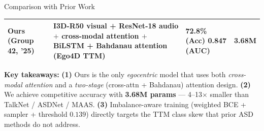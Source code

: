 \documentclass[aspectratio=169, 10pt]{beamer}
\begin{document}
\begin{frame}{Comparison with Prior Work}
\begin{center}
\begin{tabular}{@{}p{2.5cm} p{4.6cm} p{2.0cm} p{1.2cm}@{}}
\rowcolor{green!15}
\textbf{Ours} \newline\textbf{(Group 42, '25)}
 & \textbf{I3D-R50 visual + ResNet-18 audio $+$ cross-modal attention $+$ BiLSTM + Bahdanau attention (Ego4D TTM)}
 & \textbf{72.8\% (Acc)} \newline \textbf{0.847 (AUC)} & \textbf{3.68M} \\
\bottomrule
\end{tabular}
\end{center}



\vspace{0.2em}
\scriptsize
\textbf{Key takeaways:}
\textbf{(1)} Ours is the only \emph{egocentric} model that uses both
\emph{cross-modal attention} and a \emph{two-stage} (cross-attn + Bahdanau)
attention design.
\textbf{(2)} We achieve competitive accuracy with \textbf{3.68M params} ---
4--13$\times$ smaller than TalkNet / ASDNet / MAAS.
\textbf{(3)} Imbalance-aware training (weighted BCE + sampler + threshold
$0.139$) directly targets the TTM class skew that prior ASD methods do not address.

\end{frame}
\end{document}
